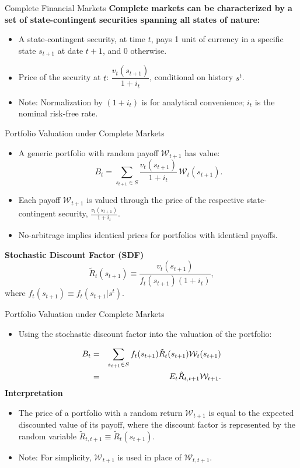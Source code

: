 \documentclass[11pt,aspectratio=169]{beamer}
\begin{document}
\begin{frame}{Complete Financial Markets}
\small
    \textbf{Complete markets can be characterized by a set of state-contingent securities spanning all states of nature:}
\begin{itemize}
    \item A state-contingent security, at time $t$, pays 1 unit of currency in a specific state $s_{t+1}$ at date $t+1$, and 0 otherwise.
    \item Price of the security at $t$: $\dfrac{v_t(s_{t+1})}{1+i_t}$, conditional on history $s^t$.
    \item Note: Normalization by $(1+i_t)$ is for analytical convenience; $i_t$ is the nominal risk-free rate.
\end{itemize}
\end{frame}

\begin{frame}{Portfolio Valuation under Complete Markets}
\small
\begin{itemize}
    \item A generic portfolio with random payoff $\mathcal{W}_{t+1}$ has value:
    \[
    B_t = \sum_{s_{t+1} \in S} \frac{v_t(s_{t+1})}{1+i_t}\,\mathcal{W}_t(s_{t+1}).
    \]
    \item Each payoff $\mathcal{W}_{t+1}$ is valued through the price of the respective state-contingent security, $\frac{v_t(s_{t+1})}{1+i_t}$.
    \item No-arbitrage implies identical prices for portfolios with identical payoffs.
\end{itemize}
\textbf{Stochastic Discount Factor (SDF)}
    \[
    \tilde{R}_{t}(s_{t+1}) \equiv \frac{v_t(s_{t+1})}{f_t(s_{t+1})(1+i_t)},
    \]
    \hspace{0.65cm}where $f_t(s_{t+1}) \equiv f_t(s_{t+1}|s^t)$.
\end{frame}

\begin{frame}{Portfolio Valuation under Complete Markets}
\small
\begin{itemize}
    \item Using the stochastic discount factor into the valuation of the portfolio:
\end{itemize}
\begin{eqnarray}
B_{t} &=&\sum_{s_{t+1}\in S}f_{t}(s_{t+1})\tilde{R}_{t}(s_{t+1})\mathcal{W}%
_{t}(s_{t+1})\notag \\
&=&E_{t}\tilde{R}_{t,t+1}\mathcal{W}_{t+1}. \label{Port_Value}
\end{eqnarray}%
\textbf{Interpretation}
\begin{itemize}
    \item The price of a portfolio with a random return $\mathcal{W}_{t+1}$ is equal to the expected discounted value of its payoff, where the discount factor is represented by the random variable $\tilde{R}_{t,t+1}\equiv \tilde{R}_{t}(s_{t+1})$. 
    \item Note: For simplicity,  $\mathcal{W}_{t+1}$ is used in place of $\mathcal{W}_{t,t+1}$.
\end{itemize}
\end{frame}
\end{document}
